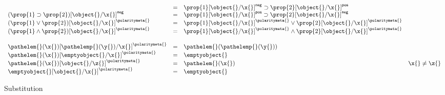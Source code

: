 \begin{figure}
$$\begin{array}{lclr}
{}
&=&
{\impprop 
  {\minuspolarity {\replacefor {\prop{1}} {\object{}} {\x{}}}}
  {\pluspolarity {\replacefor {\prop{2}} {\object{}} {\x{}}}}}
\\
{\minuspolarity
{\replacefor
  {({\impprop {\prop{1}} {\prop{2}}})}
  {\object{}}
  {\x{}}}
}
&=&
{\impprop 
  {\pluspolarity {\replacefor {\prop{1}} {\object{}} {\x{}}}}
  {\minuspolarity {\replacefor {\prop{2}} {\object{}} {\x{}}}}}
\\
{\withpolarity
{\replacefor
  {({\orprop {\prop{1}} {\prop{2}}})}
  {\object{}}
  {\x{}}}
{\polaritymeta{}}}
&=&
{\orprop 
  {\withpolarity
    {\replacefor {\prop{1}} {\object{}} {\x{}}}
    {\polaritymeta{}}}
  {\withpolarity
    {\replacefor {\prop{2}} {\object{}} {\x{}}}
    {\polaritymeta{}}}}
\\
{\withpolarity
{\replacefor
  {({\andprop {\prop{1}} {\prop{2}}})}
  {\object{}}
  {\x{}}}
{\polaritymeta{}}}
&=&
{\andprop 
{\withpolarity
  {\replacefor {\prop{1}} {\object{}} {\x{}}}
  {\polaritymeta{}}}
{\withpolarity
  {\replacefor {\prop{2}} {\object{}} {\x{}}}
  {\polaritymeta{}}}}
%
    \\\\
%
{\withpolarity
{\replacefor
  {\pth {\pathelem{}} {\x{}}}
  {\pth {\pathelemp{}} {\y{}}}
  {\x{}}}
{\polaritymeta{}}}
           &=&
{\pth{\pathelem{}}{\pth {\pathelemp{}} {\y{}}}}
%
    \\
%
{\withpolarity
{\replacefor
  {\pth {\pathelem{}} {\x{}}}
  {\emptyobject{}}
  {\x{}}}
{\polaritymeta{}}}
           &=&
{\emptyobject{}}
%
    \\
%
{\withpolarity
{\replacefor
  {\pth {\pathelem{}} {\x{}}}
  {\object{}}
  {\z{}}}
{\polaritymeta{}}}
           &=&
{\pth {\pathelem{}} {\x{}}}
%
& \x{} \not= \z{}
    \\
%
{\withpolarity
{\replacefor
  {\emptyobject{}}
  {\object{}}
  {\x{}}}
{\polaritymeta{}}}
           &=&
{\emptyobject{}}
%
\end{array}
$$
\caption{Substitution}
\end{figure}
